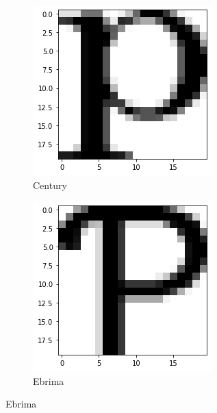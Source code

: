 \documentclass{homework}
\begin{document}
\begin{figure}[H]
\medskip
\begin{subfigure}{0.4\textwidth}
\includegraphics[width=\linewidth]{cent_p.png}
\caption{Century} \label{fig:c}
\end{subfigure}\hspace*{\fill}
\begin{subfigure}{0.4\textwidth}
\includegraphics[width=\linewidth]{ebrima_p.png}
\caption{Ebrima} \label{fig:d}
\end{subfigure}



\end{figure}
\end{document}
